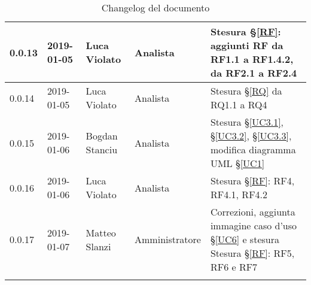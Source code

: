 \begin{center}
\begin{longtable}[c]{|m{}|m{}|m{}|m{}|p{}|}
\hline
0.0.13 & 2019-01-05 & Luca Violato & Analista & Stesura §\ref{RF}: aggiunti RF da RF1.1 a RF1.4.2, da RF2.1 a RF2.4\\
\hline
\rowcolor{grigio}0.0.14 & 2019-01-05 & Luca Violato & Analista & Stesura §\ref{RQ} da RQ1.1 a RQ4\\
\hline
0.0.15 & 2019-01-06 & Bogdan Stanciu & Analista & Stesura §\ref{UC3.1}, §\ref{UC3.2}, §\ref{UC3.3}, modifica diagramma UML §\ref{UC1} \\
\hline
\rowcolor{grigio}0.0.16 & 2019-01-06 & Luca Violato & Analista & Stesura §\ref{RF}: RF4, RF4.1, RF4.2\\
\hline
0.0.17 & 2019-01-07 & Matteo Slanzi & Amministratore & Correzioni, aggiunta immagine caso d'uso §\ref{UC6} e
stesura Stesura §\ref{RF}: RF5, RF6 e RF7 \\
\hline
\caption{Changelog del documento}
\end{longtable}
\end{center}